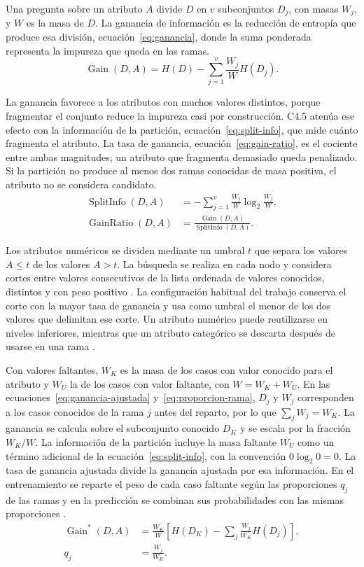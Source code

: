 \documentclass[runningheads]{llncs}
\DeclareMathOperator{\Gain}{Gain}
\DeclareMathOperator{\SplitInfo}{SplitInfo}
\DeclareMathOperator{\GainRatio}{GainRatio}
\begin{document}
Una pregunta sobre un atributo $A$ divide $D$ en $v$ subconjuntos $D_j$, con masas $W_j$, y $W$ es la masa de $D$. La ganancia de información es la reducción de entropía que produce esa división, ecuación~\eqref{eq:ganancia}, donde la suma ponderada representa la impureza que queda en las ramas.
\begin{equation}
\Gain(D,A) = H(D) - \sum_{j=1}^{v} \frac{W_j}{W} H(D_j).
\label{eq:ganancia}
\end{equation}

La ganancia favorece a los atributos con muchos valores distintos, porque fragmentar el conjunto reduce la impureza casi por construcción. C4.5 atenúa ese efecto con la información de la partición, ecuación~\eqref{eq:split-info}, que mide cuánto fragmenta el atributo. La tasa de ganancia, ecuación~\eqref{eq:gain-ratio}, es el cociente entre ambas magnitudes; un atributo que fragmenta demasiado queda penalizado. Si la partición no produce al menos dos ramas conocidas de masa positiva, el atributo no se considera candidato.
\begin{align}
\SplitInfo(D,A) &= -\sum_{j=1}^{v} \frac{W_j}{W}\log_2\frac{W_j}{W},
\label{eq:split-info}\\
\GainRatio(D,A) &= \frac{\Gain(D,A)}{\SplitInfo(D,A)}.
\label{eq:gain-ratio}
\end{align}

Los atributos numéricos se dividen mediante un umbral $t$ que separa los valores $A\le t$ de los valores $A>t$. La búsqueda se realiza en cada nodo y considera cortes entre valores consecutivos de la lista ordenada de valores conocidos, distintos y con peso positivo \cite{liu2011}. La configuración habitual del trabajo conserva el corte con la mayor tasa de ganancia y usa como umbral el menor de los dos valores que delimitan ese corte. Un atributo numérico puede reutilizarse en niveles inferiores, mientras que un atributo categórico se descarta después de usarse en una rama \cite{liu2011}.

Con valores faltantes, $W_K$ es la masa de los casos con valor conocido para el atributo y $W_U$ la de los casos con valor faltante, con $W=W_K+W_U$. En las ecuaciones~\eqref{eq:ganancia-ajustada} y~\eqref{eq:proporcion-rama}, $D_j$ y $W_j$ corresponden a los casos conocidos de la rama $j$ antes del reparto, por lo que $\sum_j W_j=W_K$. La ganancia se calcula sobre el subconjunto conocido $D_K$ y se escala por la fracción $W_K/W$. La información de la partición incluye la masa faltante $W_U$ como un término adicional de la ecuación~\eqref{eq:split-info}, con la convención $0\log_2 0=0$. La tasa de ganancia ajustada divide la ganancia ajustada por esa información. En el entrenamiento se reparte el peso de cada caso faltante según las proporciones $q_j$ de las ramas y en la predicción se combinan sus probabilidades con las mismas proporciones \cite{liu2011}.
\begin{align}
\Gain^*(D,A) &= \frac{W_K}{W}\left[H(D_K) - \sum_j \frac{W_j}{W_K}H(D_j)\right],
\label{eq:ganancia-ajustada}\\
q_j &= \frac{W_j}{W_K}.
\label{eq:proporcion-rama}
\end{align}
\end{document}
